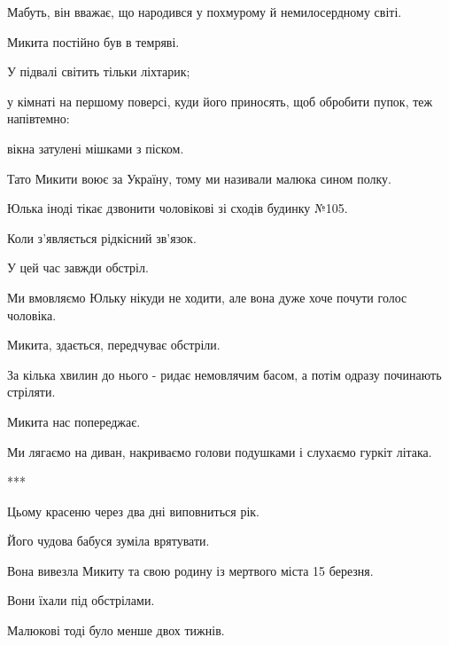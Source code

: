 Мабуть, він вважає, що народився у похмурому й немилосердному світі. \par
Микита постійно був  в темряві.\par
У підвалі світить тільки  ліхтарик;\par
у кімнаті на першому поверсі, куди його приносять, щоб обробити пупок, теж напівтемно:\par
вікна затулені мішками з піском.\par
Тато Микити воює за Україну, тому ми називали малюка сином полку. \par
Юлька іноді тікає дзвонити чоловікові зі сходів будинку №105. \par
Коли з'являється рідкісний зв'язок. \par
У цей час завжди обстріл. \par
Ми вмовляємо Юльку нікуди не ходити, але вона дуже хоче почути голос чоловіка.\par
Микита, здається, передчуває обстріли.\par
За кілька хвилин до  нього  -   ридає немовлячим басом, а потім одразу починають стріляти. \par
Микита нас попереджає.\par
Ми лягаємо на диван, накриваємо голови подушками і слухаємо гуркіт літака.\par
***\par
Цьому красеню через два дні виповниться рік.\par
Його чудова бабуся зуміла врятувати.\par
Вона вивезла Микиту та свою родину  із мертвого міста 15 березня.\par
Вони їхали під обстрілами.\par
Малюкові тоді  було менше двох тижнів.\par
